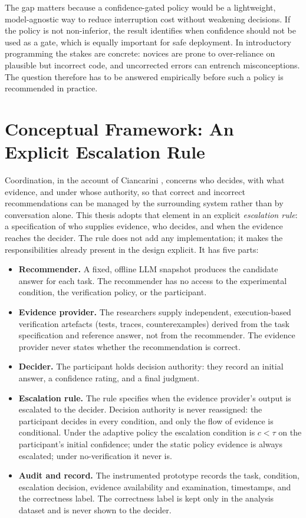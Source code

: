 \documentclass[oneside,final,14pt,a4paper]{extreport}
\begin{document}
The gap matters because a confidence-gated policy would be a lightweight,
model-agnostic way to reduce interruption cost without weakening decisions. If
the policy is not non-inferior, the result identifies when confidence should not
be used as a gate, which is equally important for safe deployment. In
introductory programming the stakes are concrete: novices are prone to
over-reliance on plausible but incorrect code, and uncorrected errors can
entrench misconceptions. The question therefore has to be answered empirically
before such a policy is recommended in practice.

\section{Conceptual Framework: An Explicit Escalation Rule}
\label{subsec:protocol}

Coordination, in the account of Ciancarini \cite{Ciancarini2027}, concerns who
decides, with what evidence, and under whose authority, so that correct and
incorrect recommendations can be managed by the surrounding system rather than
by conversation alone. This thesis adopts that element in an explicit
\emph{escalation rule}: a specification of who supplies evidence, who decides,
and when the evidence reaches the decider. The rule does not add any
implementation; it makes the responsibilities already present in the design
explicit. It has five parts:

\begin{itemize}
    \item \textbf{Recommender.} A fixed, offline LLM snapshot produces the
    candidate answer for each task. The recommender has no access to the
    experimental condition, the verification policy, or the participant.
    \item \textbf{Evidence provider.} The researchers supply independent,
    execution-based verification artefacts (tests, traces, counterexamples)
    derived from the task specification and reference answer, not from the
    recommender. The evidence provider never states whether the recommendation
    is correct.
    \item \textbf{Decider.} The participant holds decision authority: they
    record an initial answer, a confidence rating, and a final judgment.
    \item \textbf{Escalation rule.} The rule specifies when the evidence
    provider's output is escalated to the decider. Decision authority is never
    reassigned: the participant decides in every condition, and only the flow
    of evidence is conditional. Under the adaptive policy the escalation
    condition is $c<\tau$ on the participant's initial confidence; under the
    static policy evidence is always escalated; under no-verification it never
    is.
    \item \textbf{Audit and record.} The instrumented prototype records the
    task, condition, escalation decision, evidence availability and examination,
    timestamps, and the correctness label. The correctness label is kept only in
    the analysis dataset and is never shown to the decider.
\end{itemize}
\end{document}
